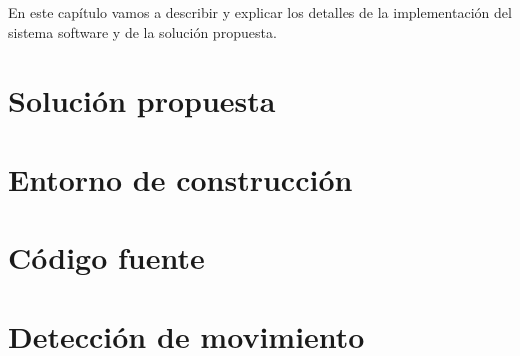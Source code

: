 

En este capítulo vamos a describir y explicar los detalles de la implementación del sistema software y de la solución propuesta.

\section{Solución propuesta}

\section{Entorno de construcción}

\section{Código fuente}

\section{Detección de movimiento}



